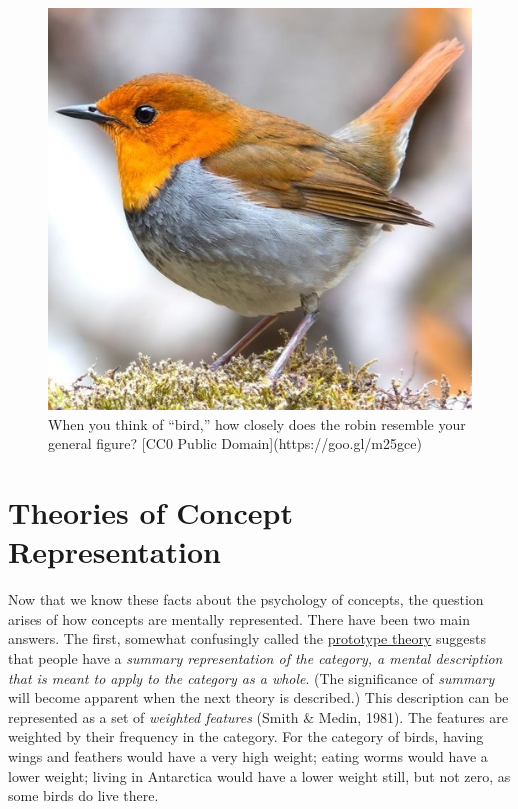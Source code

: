 \documentclass[
]{krantz}
\begin{document}
\begin{figure}

{\centering \includegraphics[width=0.4\linewidth]{images/ch7/bird} 

}

\caption{When you think of “bird,” how closely does the robin resemble your general figure? [CC0 Public Domain](https://goo.gl/m25gce)}\label{fig:bird}
\end{figure}

\hypertarget{theories-of-concept-representation}{%
\section{Theories of Concept Representation}\label{theories-of-concept-representation}}

Now that we know these facts about the psychology of concepts, the question arises of how concepts are mentally represented. There have been two main answers. The first, somewhat confusingly called the \protect\hyperlink{prototype-theory}{prototype theory} suggests that people have a \emph{summary representation of the category, a mental description that is meant to apply to the category as a whole}. (The significance of \emph{summary} will become apparent when the next theory is described.) This description can be represented as a set of \emph{weighted features} (Smith \& Medin, 1981). The features are weighted by their frequency in the category. For the category of birds, having wings and feathers would have a very high weight; eating worms would have a lower weight; living in Antarctica would have a lower weight still, but not zero, as some birds do live there.
\end{document}
